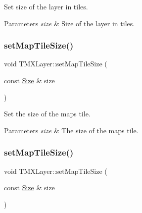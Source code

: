 Set size of the layer in tiles.


\begin{DoxyParams}{Parameters}
{\em size} & \hyperlink{classSize}{Size} of the layer in tiles. \\
\hline
\end{DoxyParams}
\mbox{\label{classTMXLayer_aefb7200c533405f89265e1c1cf1c7314}} 
\subsubsection{\texorpdfstring{set\+Map\+Tile\+Size()}{setMapTileSize()}\hspace{0.1cm}{\footnotesize\ttfamily [1/2]}}
{\footnotesize\ttfamily void T\+M\+X\+Layer\+::set\+Map\+Tile\+Size (\begin{DoxyParamCaption}\item[{const \hyperlink{classSize}{Size} \&}]{size }\end{DoxyParamCaption})\hspace{0.3cm}{\ttfamily [inline]}}

Set the size of the map\textquotesingle{}s tile.


\begin{DoxyParams}{Parameters}
{\em size} & The size of the map\textquotesingle{}s tile. \\
\hline
\end{DoxyParams}
\mbox{\label{classTMXLayer_aefb7200c533405f89265e1c1cf1c7314}} 
\subsubsection{\texorpdfstring{set\+Map\+Tile\+Size()}{setMapTileSize()}\hspace{0.1cm}{\footnotesize\ttfamily [2/2]}}
{\footnotesize\ttfamily void T\+M\+X\+Layer\+::set\+Map\+Tile\+Size (\begin{DoxyParamCaption}\item[{const \hyperlink{classSize}{Size} \&}]{size }\end{DoxyParamCaption})\hspace{0.3cm}{\ttfamily [inline]}}

